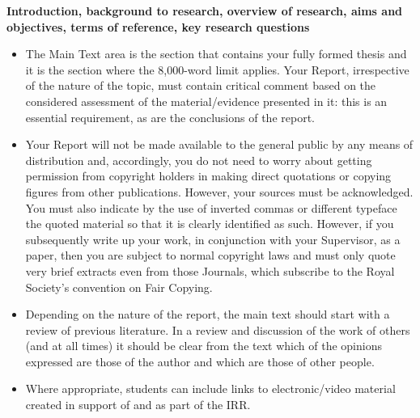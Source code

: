 \textbf{Introduction, background to research, overview of research, aims and objectives, terms of reference, key research questions}

\begin{itemize}
	\item The Main Text area is the section that contains your fully formed thesis and it is the section where the 8,000-word limit applies.
	Your Report, irrespective of the nature of the topic, must contain critical comment based on the considered assessment of the material/evidence presented in it: this is an essential requirement, as are the conclusions of the report.
	\item Your Report will not be made available to the general public by any means of distribution and, accordingly, you do not need to worry about getting permission from copyright holders in making direct quotations or copying figures from other publications. However, your sources must be acknowledged. You must also indicate by the use of inverted commas or different typeface the quoted material so that it is clearly identified as such. However, if you subsequently write up your work, in conjunction with your Supervisor, as a paper, then you are subject to normal copyright laws and must only quote very brief extracts even from those Journals, which subscribe to the Royal Society's convention on Fair Copying.
	\item Depending on the nature of the report, the main text should start with a review of previous literature. In a review and discussion of the work of others (and at all times) it should be clear from the text which of the opinions expressed are those of the author and which are those of other people.
	\item Where appropriate, students can include links to electronic/video material created in support of and as part of the IRR.
	
	
	
\end{itemize}

